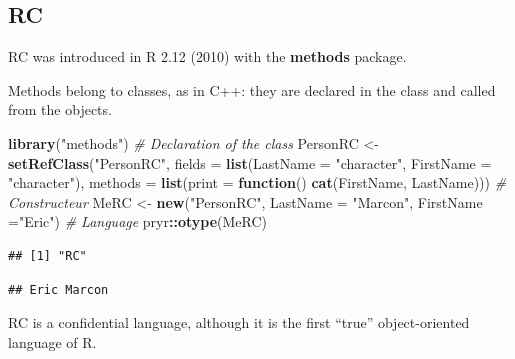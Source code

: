 \documentclass[
  12pt,
  american,
  a4paper,
  extrafontsizes,onecolumn,openright
  ]{memoir}
\newenvironment{Shaded}{\begin{snugshade}}{\end{snugshade}}
\newcommand{\AttributeTok}[1]{\textcolor[rgb]{0.13,0.29,0.53}{#1}}
\newcommand{\CommentTok}[1]{\textcolor[rgb]{0.56,0.35,0.01}{\textit{#1}}}
\newcommand{\ControlFlowTok}[1]{\textcolor[rgb]{0.13,0.29,0.53}{\textbf{#1}}}
\newcommand{\FunctionTok}[1]{\textcolor[rgb]{0.13,0.29,0.53}{\textbf{#1}}}
\newcommand{\NormalTok}[1]{#1}
\newcommand{\OtherTok}[1]{\textcolor[rgb]{0.56,0.35,0.01}{#1}}
\newcommand{\SpecialCharTok}[1]{\textcolor[rgb]{0.81,0.36,0.00}{\textbf{#1}}}
\newcommand{\StringTok}[1]{\textcolor[rgb]{0.31,0.60,0.02}{#1}}
\begin{document}
\subsection{RC}\label{rc}

RC was introduced in R 2.12 (2010) with the \textbf{methods} package.

Methods belong to classes, as in C++: they are declared in the class and called from the objects.

\scriptsize

\begin{Shaded}
\begin{Highlighting}[]
\FunctionTok{library}\NormalTok{(}\StringTok{"methods"}\NormalTok{)}
\CommentTok{\# Declaration of the class}
\NormalTok{PersonRC }\OtherTok{\textless{}{-}} \FunctionTok{setRefClass}\NormalTok{(}\StringTok{"PersonRC"}\NormalTok{, }
    \AttributeTok{fields =} \FunctionTok{list}\NormalTok{(}\AttributeTok{LastName =} \StringTok{"character"}\NormalTok{, }\AttributeTok{FirstName =} \StringTok{"character"}\NormalTok{),}
    \AttributeTok{methods =} \FunctionTok{list}\NormalTok{(}\AttributeTok{print =} \ControlFlowTok{function}\NormalTok{() }\FunctionTok{cat}\NormalTok{(FirstName, LastName)))}
\CommentTok{\# Constructeur}
\NormalTok{MeRC }\OtherTok{\textless{}{-}} \FunctionTok{new}\NormalTok{(}\StringTok{"PersonRC"}\NormalTok{, }\AttributeTok{LastName =} \StringTok{"Marcon"}\NormalTok{, }\AttributeTok{FirstName =}\StringTok{"Eric"}\NormalTok{)}
\CommentTok{\# Language}
\NormalTok{pryr}\SpecialCharTok{::}\FunctionTok{otype}\NormalTok{(MeRC)}
\end{Highlighting}
\end{Shaded}

\begin{verbatim}
## [1] "RC"
\end{verbatim}

\begin{Shaded}
\end{Shaded}

\begin{verbatim}
## Eric Marcon
\end{verbatim}

\normalsize

RC is a confidential language, although it is the first \enquote{true} object-oriented language of R.
\end{document}
